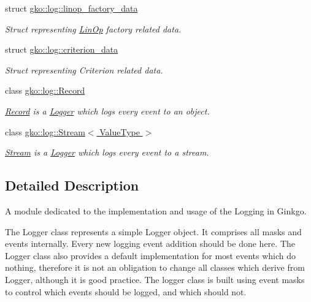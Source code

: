 \begin{DoxyCompactItemize}
struct \hyperlink{structgko_1_1log_1_1linop__factory__data}{gko\+::log\+::linop\+\_\+factory\+\_\+data}
\begin{DoxyCompactList}\small\item\em Struct representing \hyperlink{classgko_1_1LinOp}{Lin\+Op} factory related data. \end{DoxyCompactList}\item 
struct \hyperlink{structgko_1_1log_1_1criterion__data}{gko\+::log\+::criterion\+\_\+data}
\begin{DoxyCompactList}\small\item\em Struct representing Criterion related data. \end{DoxyCompactList}\item 
class \hyperlink{classgko_1_1log_1_1Record}{gko\+::log\+::\+Record}
\begin{DoxyCompactList}\small\item\em \hyperlink{classgko_1_1log_1_1Record}{Record} is a \hyperlink{classgko_1_1log_1_1Logger}{Logger} which logs every event to an object. \end{DoxyCompactList}\item 
class \hyperlink{classgko_1_1log_1_1Stream}{gko\+::log\+::\+Stream$<$ Value\+Type $>$}
\begin{DoxyCompactList}\small\item\em \hyperlink{classgko_1_1log_1_1Stream}{Stream} is a \hyperlink{classgko_1_1log_1_1Logger}{Logger} which logs every event to a stream. \end{DoxyCompactList}\end{DoxyCompactItemize}


\subsection{Detailed Description}
A module dedicated to the implementation and usage of the Logging in Ginkgo. 

The Logger class represents a simple Logger object. It comprises all masks and events internally. Every new logging event addition should be done here. The Logger class also provides a default implementation for most events which do nothing, therefore it is not an obligation to change all classes which derive from Logger, although it is good practice. The logger class is built using event masks to control which events should be logged, and which should not. 
